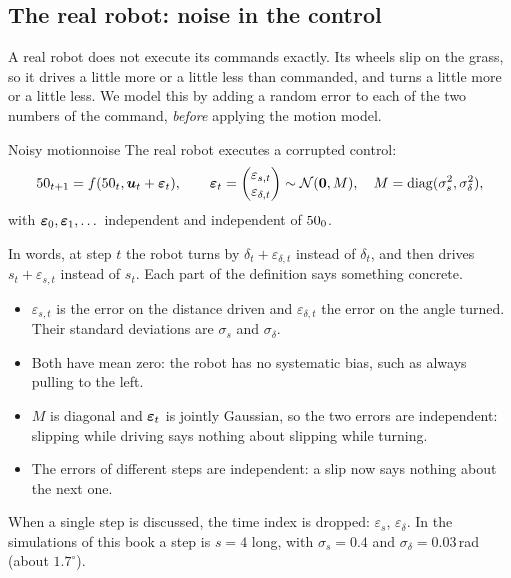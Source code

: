 \subsection{The real robot: noise in the control}
\label{sec:noise}

A real robot does not execute its commands exactly. Its wheels slip on the
grass, so it drives a little more or a little less than commanded, and
turns a little more or a little less. We model this by adding a random
error to each of the two numbers of the command, \emph{before} applying
the motion model.

\begin{definition}{Noisy motion}{noise}
The real robot executes a corrupted control:
\begin{equation}\label{eq:motionnoise}
  50_{t+1}=f(50_t,\bm{u}_t+\bm{\varepsilon}_t),\qquad
  \bm{\varepsilon}_t=\begin{pmatrix}\varepsilon_{s,t}\\\varepsilon_{\delta,t}
  \end{pmatrix}\sim\mathcal{N}(\bm{0},M),\quad
  M=\operatorname{diag}(\sigma_s^2,\sigma_\delta^2),
\end{equation}
with $\bm{\varepsilon}_0,\bm{\varepsilon}_1,\dots$ independent and independent of
$50_0$.
\end{definition}

In words, at step $t$ the robot turns by $\delta_t+\varepsilon_{\delta,t}$
instead of $\delta_t$, and then drives $s_t+\varepsilon_{s,t}$ instead of
$s_t$. Each part of the definition says something concrete.
\begin{itemize}[nosep]
  \item $\varepsilon_{s,t}$ is the error on the distance driven and
    $\varepsilon_{\delta,t}$ the error on the angle turned. Their standard
    deviations are $\sigma_s$ and $\sigma_\delta$.
  \item Both have mean zero: the robot has no systematic bias, such as
    always pulling to the left.
  \item $M$ is diagonal and $\bm{\varepsilon}_t$ is jointly Gaussian, so the two
    errors are independent: slipping while driving says nothing about
    slipping while turning.
  \item The errors of different steps are independent: a slip now says
    nothing about the next one.
\end{itemize}
When a single step is discussed, the time index is dropped:
$\varepsilon_s$, $\varepsilon_\delta$. In the simulations of this book a
step is $s=4$ long, with $\sigma_s=0.4$ and $\sigma_\delta=0.03$\,rad
(about $1.7^\circ$).

